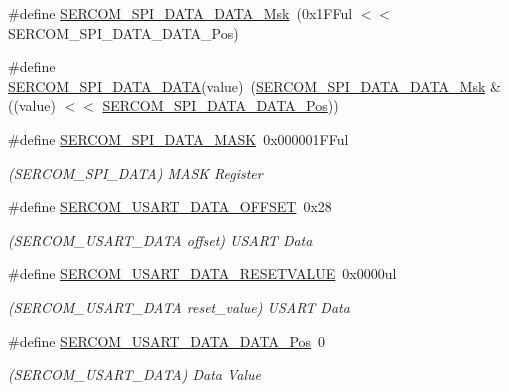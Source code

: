 \begin{DoxyCompactItemize}
\#define \mbox{\hyperlink{group___s_a_m_d21___s_e_r_c_o_m_gaa4d1e0723a5c13d88e442cef9e637c11}{S\+E\+R\+C\+O\+M\+\_\+\+S\+P\+I\+\_\+\+D\+A\+T\+A\+\_\+\+D\+A\+T\+A\+\_\+\+Msk}}~(0x1\+F\+Ful $<$$<$ S\+E\+R\+C\+O\+M\+\_\+\+S\+P\+I\+\_\+\+D\+A\+T\+A\+\_\+\+D\+A\+T\+A\+\_\+\+Pos)
\item 
\#define \mbox{\hyperlink{group___s_a_m_d21___s_e_r_c_o_m_ga9c93081c778346554599502a56bfe854}{S\+E\+R\+C\+O\+M\+\_\+\+S\+P\+I\+\_\+\+D\+A\+T\+A\+\_\+\+D\+A\+TA}}(value)~(\mbox{\hyperlink{group___s_a_m_d21___s_e_r_c_o_m_gaa4d1e0723a5c13d88e442cef9e637c11}{S\+E\+R\+C\+O\+M\+\_\+\+S\+P\+I\+\_\+\+D\+A\+T\+A\+\_\+\+D\+A\+T\+A\+\_\+\+Msk}} \& ((value) $<$$<$ \mbox{\hyperlink{group___s_a_m_d21___s_e_r_c_o_m_ga2bc3a8d8660c1c7eaf18928fb7214cf3}{S\+E\+R\+C\+O\+M\+\_\+\+S\+P\+I\+\_\+\+D\+A\+T\+A\+\_\+\+D\+A\+T\+A\+\_\+\+Pos}}))
\item 
\#define \mbox{\hyperlink{group___s_a_m_d21___s_e_r_c_o_m_ga5945fdb340e8178f48da71de4665d391}{S\+E\+R\+C\+O\+M\+\_\+\+S\+P\+I\+\_\+\+D\+A\+T\+A\+\_\+\+M\+A\+SK}}~0x000001\+F\+Ful
\begin{DoxyCompactList}\small\item\em (S\+E\+R\+C\+O\+M\+\_\+\+S\+P\+I\+\_\+\+D\+A\+TA) M\+A\+SK Register \end{DoxyCompactList}\item 
\#define \mbox{\hyperlink{group___s_a_m_d21___s_e_r_c_o_m_ga4e1a7443e7d7e188c59693b917e3e139}{S\+E\+R\+C\+O\+M\+\_\+\+U\+S\+A\+R\+T\+\_\+\+D\+A\+T\+A\+\_\+\+O\+F\+F\+S\+ET}}~0x28
\begin{DoxyCompactList}\small\item\em (S\+E\+R\+C\+O\+M\+\_\+\+U\+S\+A\+R\+T\+\_\+\+D\+A\+TA offset) U\+S\+A\+RT Data \end{DoxyCompactList}\item 
\#define \mbox{\hyperlink{group___s_a_m_d21___s_e_r_c_o_m_ga21116d7d356af5eb091565415335bf0e}{S\+E\+R\+C\+O\+M\+\_\+\+U\+S\+A\+R\+T\+\_\+\+D\+A\+T\+A\+\_\+\+R\+E\+S\+E\+T\+V\+A\+L\+UE}}~0x0000ul
\begin{DoxyCompactList}\small\item\em (S\+E\+R\+C\+O\+M\+\_\+\+U\+S\+A\+R\+T\+\_\+\+D\+A\+TA reset\+\_\+value) U\+S\+A\+RT Data \end{DoxyCompactList}\item 
\#define \mbox{\hyperlink{group___s_a_m_d21___s_e_r_c_o_m_ga59582f5f0a9857f58a371c3ddc943e3d}{S\+E\+R\+C\+O\+M\+\_\+\+U\+S\+A\+R\+T\+\_\+\+D\+A\+T\+A\+\_\+\+D\+A\+T\+A\+\_\+\+Pos}}~0
\begin{DoxyCompactList}\small\item\em (S\+E\+R\+C\+O\+M\+\_\+\+U\+S\+A\+R\+T\+\_\+\+D\+A\+TA) Data Value \end{DoxyCompactList}\item 

\end{DoxyCompactItemize}
